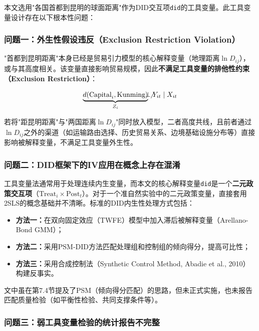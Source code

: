 \documentclass[12pt, a4paper]{article}
\begin{document}
\begin{criticalbox}

本文选用"各国首都到昆明的球面距离"作为DID交互项\texttt{did}的工具变量。此工具变量设计存在以下根本性问题：

\subsubsection{问题一：外生性假设违反（Exclusion Restriction Violation）}

"首都到昆明距离"本身已经是贸易引力模型的核心解释变量（地理距离$\ln D_{ij}$），或与其高度相关。该变量直接影响贸易规模，因此\textbf{不满足工具变量的排他性约束（Exclusion Restriction）}：

\begin{equation}
  \underbrace{d(\text{Capital}_i, \text{Kunming})}_{Z_i} \not\!\!\!\!\perp Y_{it} \mid X_{it}
\end{equation}

若将"距昆明距离"与"两国距离$\ln D_{ij}$"同时放入模型，二者高度共线，且前者通过$\ln D_{ij}$之外的渠道（如运输路由选择、历史贸易关系、边境基础设施分布等）直接影响被解释变量，不满足工具变量外生性。

\subsubsection{问题二：DID框架下的IV应用在概念上存在混淆}

工具变量法通常用于处理连续内生变量，而本文的核心解释变量\texttt{did}是一个\textbf{二元政策交互项}（$\text{Treat}_i \times \text{Post}_t$）。对于一个准自然实验中的二元政策变量，直接套用2SLS的概念基础并不清晰。标准的DID内生性处理方式包括：

\begin{itemize}
  \item \textbf{方法一：}在双向固定效应（TWFE）模型中加入滞后被解释变量（Arellano-Bond GMM）；
  \item \textbf{方法二：}采用PSM-DID方法匹配处理组和控制组的倾向得分，提高可比性；
  \item \textbf{方法三：}采用合成控制法（Synthetic Control Method, Abadie et al., 2010）构建反事实。
\end{itemize}

文中虽在第7.4节提及了PSM（倾向得分匹配）的思路，但未正式实施，也未报告匹配质量检验（如平衡性检验、共同支撑条件等）。

\subsubsection{问题三：弱工具变量检验的统计报告不完整}


\end{criticalbox}
\end{document}
